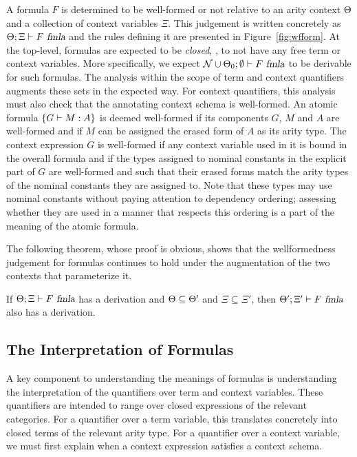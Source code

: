 A formula $F$ is determined to be well-formed or not relative to an arity
context $\Theta$ and a collection of context variables $\Xi$.
%
This judgement is written concretely as $\Theta;\Xi \vdash F\ \mbox{\sl fmla}$
and the rules defining it are presented in Figure~\ref{fig:wfform}.
%
At the top-level, formulas are expected to be \emph{closed}, \ie, to not have
any free term or context variables.
%
More specifically, we expect $\mathcal{N} \cup \Theta_0;\emptyset \vdash F\ \mbox{\sl fmla}$ to be
derivable for such formulas. 
%
The analysis within the scope of term and context
quantifiers augments these sets in the expected way.
%
For context quantifiers, this analysis must also check that the
annotating context schema is well-formed.
%
An atomic formula $\left\{G \vdash M:A\right\}$ is deemed well-formed if its
components $G$, $M$ and $A$ are well-formed and if $M$ can be assigned
the erased form of $A$ as its arity type.
%
The context expression $G$ is well-formed if any context variable used
in it is bound in the overall formula and if the types assigned to
nominal constants in the explicit part of $G$ are well-formed and
such that their erased forms match the arity types of the nominal
constants they are assigned to.
%
Note that these types may use nominal constants without paying
attention to dependency ordering; assessing
whether they are used in a manner that respects this ordering is a part
of the meaning of the atomic formula.

The following theorem, whose proof is obvious, shows that
the wellformedness judgement for formulas continues to
hold under the augmentation of the two contexts that  parameterize it. 
%
\begin{theorem}\label{th:wfsupset}
If $\Theta;\Xi \vdash F\ \mbox{\sl fmla}$ has a derivation and $\Theta
\subseteq \Theta'$ and $\Xi \subseteq \Xi'$, then
$\Theta';\Xi' \vdash F\ \mbox{\sl fmla}$ also has a derivation.
\end{theorem}

\subsection{The Interpretation of Formulas}

A key component to understanding the meanings of formulas is
understanding the interpretation of the quantifiers over term and
context variables.
%
These quantifiers are intended to range over closed expressions of the
relevant categories.
%
For a quantifier over a term variable, this translates concretely into
closed terms of the relevant arity type.
%
For a quantifier over a context variable, we must first explain when
a context expression satisfies a context schema. 

